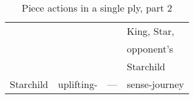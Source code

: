 \begin{table}[!h]
\begin{tabular}{ llll }
                            &                           &                               & King, Star,               \\
                            &                           &                               & opponent's                \\
                            &                           &                               & Starchild                 \\
\cmidrule{1-4} %
Starchild                   & uplifting-                & ---                           & sense-journey             \\
\bottomrule %
\end{tabular}
\caption{Piece actions in a single ply, part 2}
\label{tbl:Appendix/Summary/Piece actions, part 2}
\end{table}


